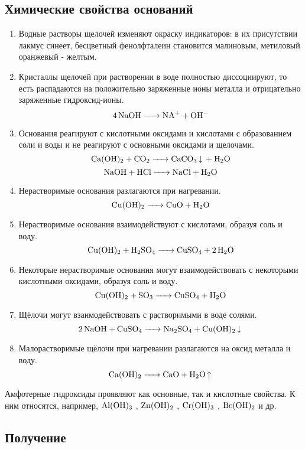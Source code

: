 \subsection{Химические свойства оснований}

\begin{enumerate}
    \item Водные растворы щелочей изменяют окраску индикаторов: в их присутствии
        лакмус синеет, бесцветный фенолфталеин становится малиновым, метиловый
        оранжевый - желтым.
    \item Кристаллы щелочей при растворении в воде полностью диссоциируют, то есть
        распадаются на положительно заряженные ионы металла и отрицательно
        заряженные гидроксид-ионы.
        $$\ce{4NaOH -> NA+ + OH-}$$
    \item Основания реагируют с кислотными оксидами и кислотами с образованием соли
        и воды и не реагируют с основными оксидами и щелочами.
        $$\ce{Ca(OH)2 + CO2 -> CaCO3 v + H2O}$$
        $$\ce{NaOH + HCl -> NaCl + H2O}$$
    \item Нерастворимые основания разлагаются при нагревании.
        $$\ce{Cu(OH)2 -> CuO + H2O}$$
    \item Нерастворимые основания взаимодействуют с кислотами, образуя соль и воду.
        $$\ce{Cu(OH)2 + H2SO4 -> CuSO4 + 2H2O}$$
    \item Некоторые нерастворимые основания могут взаимодействовать с некоторыми
        кислотными оксидами, образуя соль и воду.
        $$\ce{Cu(OH)2 + SO3 -> CuSO4 + H2O}$$
    \item Щёлочи могут взаимодействовать с растворимыми в воде солями.
        $$\ce{2NaOH + CuSO4 -> Na2SO4 + Cu(OH)2 v}$$
    \item Малорастворимые щёлочи при нагревании разлагаются на оксид металла и воду.
        $$\ce{Ca(OH)2 -> CaO + H2O ^}$$
\end{enumerate}

Амфотерные гидроксиды проявляют как основные, так и кислотные свойства.
К ним относятся, например, $\ce{Al(OH)3}$ , $\ce{Zn(OH)2}$ , $\ce{Cr(OH)3}$ , $\ce{Be(OH)2}$ и др.

\subsection{Получение}

